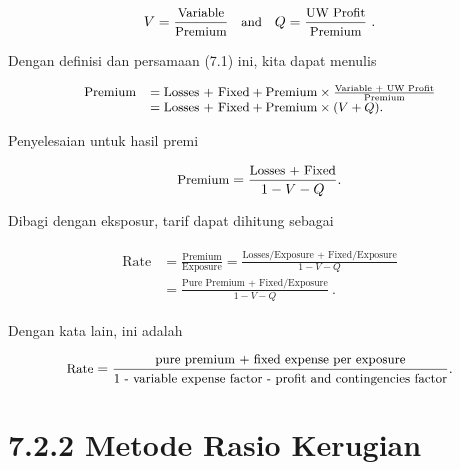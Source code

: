 \documentclass[
]{book}
\begin{document}
\begin{equation}
\small{
V =  \frac{\text{Variable}}{\text{Premium}} ~~~ \text{and}~~~
Q = \frac{\text{UW Profit}}{\text{Premium}} ~.
}
\end{equation}

Dengan definisi dan persamaan (7.1) ini, kita dapat menulis

\begin{equation}
\small{
\begin{matrix}
\begin{array}{ll}
\text{Premium} &= \text{Losses + Fixed} + \text{Premium} \times \frac{\text{Variable + UW Profit}}{\text{Premium}}  \\
& = \text{Losses + Fixed} + \text{Premium} \times (V+Q) .
\end{array}
\end{matrix}
}
\end{equation}

Penyelesaian untuk hasil premi

\begin{equation}
\small{
\text{Premium} = \frac{\text{Losses + Fixed}}{1-V-Q} .
}
\end{equation}

Dibagi dengan eksposur, tarif dapat dihitung sebagai

\begin{equation}
\begin{matrix}
\begin{array}{ll}
\text{Rate} &= \frac{\text{Premium}}{\text{Exposure}} = \frac{\text{Losses/Exposure + Fixed/Exposure}}{1-V-Q} \\
&=   \frac{\text{Pure Premium + Fixed/Exposure}}{1-V-Q} ~.
\end{array}
\end{matrix}
\end{equation}

Dengan kata lain, ini adalah

\begin{equation}
\small{
\text{Rate} =\frac{\text{pure premium + fixed expense per exposure}}{\text{1 - variable expense factor - profit and contingencies factor}}  .
}
\end{equation}

\hypertarget{metode-rasio-kerugian}{%
\section{7.2.2 Metode Rasio Kerugian}\label{metode-rasio-kerugian}}
\end{document}
